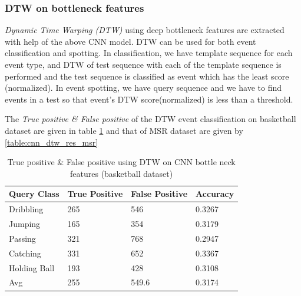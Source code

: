 \subsubsection{DTW on bottleneck features}
\textit{Dynamic Time Warping (DTW)} using deep bottleneck features are extracted with help of the above CNN model. DTW can be used for both event classification and spotting. In classification, we have template sequence for each event type, and DTW of test sequence with each of the template sequence is performed and the test sequence is classified as event which has the least score (normalized). In event spotting, we have query sequence and we have to find events in a test so that event's DTW score(normalized) is less than a threshold.


The \textit{True positive \& False positive} of the DTW event classification on basketball dataset are given in table \ref{table:cnn_dtw_res_basket} and that of MSR dataset are given by \ref{table:cnn_dtw_res_msr}

\begin{table}[ht]
\caption[Event classification using DTW on CNN bottleneck features (OSUPEL basketball dataset) ]{True positive \& False positive using DTW on CNN bottle neck features (basketball dataset)}
\label{table:cnn_dtw_res_basket}
\centering
\begin{tabular}{|l|l|l|l|}
\hline
Query Class & True Positive & False Positive & Accuracy \\ \hline
Dribbling   &265  &546   &0.3267\\
Jumping     &165  &354   &0.3179\\
Passing     &321  &768   &0.2947\\
Catching    &331  &652   &0.3367\\
Holding Ball &193  &428   &0.3108\\
\hline
Avg         &255  &549.6 &0.3174\\
\hline  
\end{tabular}
\end{table} 

